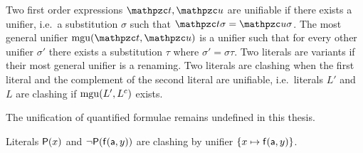 
\begin{definition}\label{def:unifier}
Two first order expressions $\mct, \mcu$ are {\myem unifiable} if there exists a {\myem unifier},
i.e.~a substitution $\sigma$ such that $\mct\sigma=\mcu\sigma$.
The {\myem most general unifier} $\mgu(\mct,\mcu)$ is a unifier such that
for every other unifier $\sigma'$ there exists a substitution $\tau$ where
$\sigma' = \sigma \tau$.
Two literals are variants if their most general unifier is a renaming.
Two literals are {\myem clashing} when the first literal
and the complement of the second literal are unifiable,
i.e.~literals $L'$ and $L$ are clashing if $\operatorname{mgu}(L', L^c)$ exists.
\end{definition}

\begin{remark}
	The unification of quantified formulae remains undefined in this thesis.
\end{remark}

\begin{example}
	Literals $\mathsf{P}(x)$ and $\lnot\mathsf{P}(\mathsf{f}(\mathsf{a},y))$
	are clashing by unifier $\{ x\mapsto \mathsf{f}(\mathsf{a},y)\}$.
\end{example}